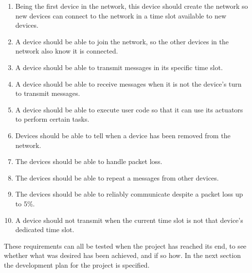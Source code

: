 \begin{enumerate}[label=\itshape \alph*\upshape)]
    \item Being the first device in the network, this device should create the network so new devices can connect to the network in a time slot available to new devices.
    \item A device should be able to join the network, so the other devices in the network also know it is connected.
    \item A device should be able to transmit messages in its specific time slot.
    \item A device should be able to receive messages when it is not the device's turn to transmit messages.
    \item A device should be able to execute user code so that it can use its actuators to perform certain tasks.
    \item Devices should be able to tell when a device has been removed from the network.
    \item The devices should be able to handle packet loss.
    \item The devices should be able to repeat a messages from other devices.
    \item The devices should be able to reliably communicate despite a packet loss up to 5\%.
    \item A device should not transmit when the current time slot is not that device's dedicated time slot. 
\end{enumerate}

These requirements can all be tested when the project has reached its end, to see whether what was desired has been achieved, and if so how. 
In the next section the development plan for the project is specified.